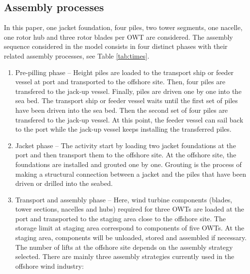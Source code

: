 \subsection{Assembly processes}
In this paper, one jacket foundation, four piles, two tower segments, one nacelle, one rotor hub and three rotor blades per OWT are considered. The assembly sequence considered in the model consists in four distinct phases with their related assembly processes, see Table \ref{tab:times}.
\begin{enumerate}
\item Pre-pilling phase -- Height piles are loaded to the transport ship or feeder vessel at port and transported to the offshore site. Then, four piles are transfered to the jack-up vessel. Finally, piles are driven one by one into the sea bed. The transport ship or feeder vessel waits until the first set of piles have been driven into the sea bed. Then the second set of four piles are transfered to the jack-up vessel. At this point, the feeder vessel can sail back to the port while the jack-up vessel keeps installing the transferred piles. %

\item Jacket phase -- The activity start by loading two jacket foundations at the port and then transport them to the offshore site. At the offshore site, the foundations are installed and grouted one by one. Grouting is the process of making a structural connection between a jacket and the piles that have been driven or drilled into the seabed. %

\item Transport and assembly phase -- Here, wind turbine components (blades, tower sections, nacelles and hubs) required for three OWTs are loaded at the port and transported to the staging area close to the offshore site. The storage limit at staging area correspond to components of five OWTs. At the staging area, components will be unloaded, stored and assembled if necessary. The number of lifts at the offshore site depends on the assembly strategy selected. There are mainly three assembly strategies currently used in the offshore wind industry:


\end{enumerate}
